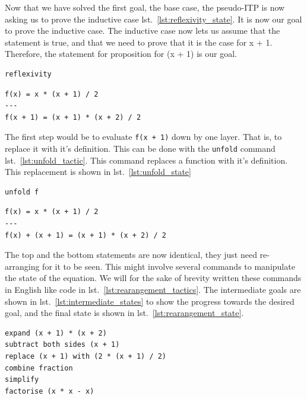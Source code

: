 \documentclass[
]{article}
\newcommand{\passthrough}[1]{#1}
\begin{document}
Now that we have solved the first goal, the base case, the pseudo-ITP is
now asking us to prove the inductive case
lst.~\ref{lst:reflexivity_state}. It is now our goal to prove the
inductive case. The inductive case now lets us assume that the statement
is true, and that we need to prove that it is the case for x + 1.
Therefore, the statement for proposition for (x + 1) is our goal.

\begin{lstlisting}[caption={Running the reflexivity tactic}, label=lst:reflexivity_tactic]
reflexivity
\end{lstlisting}

\begin{lstlisting}[caption={State after running the reflexivity tactic}, label=lst:reflexivity_state]
f(x) = x * (x + 1) / 2
---
f(x + 1) = (x + 1) * (x + 2) / 2
\end{lstlisting}

The first step would be to evaluate \passthrough{\lstinline!f(x + 1)!}
down by one layer. That is, to replace it with it's definition. This can
be done with the \passthrough{\lstinline!unfold!} command
lst.~\ref{lst:unfold_tactic}. This command replaces a function with it's
definition. This replacement is shown in lst.~\ref{lst:unfold_state}

\begin{lstlisting}[caption={Running the unfold tactic}, label=lst:unfold_tactic]
unfold f
\end{lstlisting}

\begin{lstlisting}[caption={State after running the reflexivity tactic}, label=lst:unfold_state]
f(x) = x * (x + 1) / 2
---
f(x) + (x + 1) = (x + 1) * (x + 2) / 2
\end{lstlisting}

The top and the bottom statements are now identical, they just need
re-arranging for it to be seen. This might involve several commands to
manipulate the state of the equation. We will for the sake of brevity
written these commands in English like code in
lst.~\ref{lst:rearangement_tactics}. The intermediate goals are shown in
lst.~\ref{lst:intermediate_states} to show the progress towards the
desired goal, and the final state is shown in
lst.~\ref{lst:rearangement_state}.

\begin{lstlisting}[caption={Running re-arangement tactics}, label=lst:rearangement_tactics]
expand (x + 1) * (x + 2)
subtract both sides (x + 1)
replace (x + 1) with (2 * (x + 1) / 2)
combine fraction
simplify
factorise (x * x - x)
\end{lstlisting}
\end{document}
